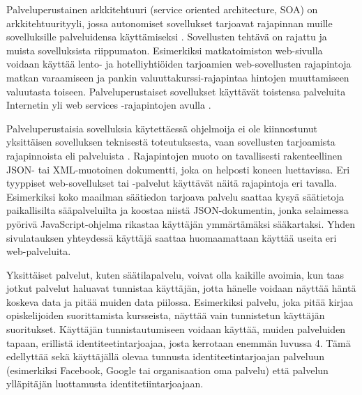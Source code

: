 Palveluperustainen arkkitehtuuri (service oriented architecture, SOA) on arkkitehtuurityyli, jossa autonomiset sovellukset tarjoavat rajapinnan muille sovelluksille palveluidensa käyttämiseksi \cite{soa}. Sovellusten tehtävä on rajattu ja muista sovelluksista riippumaton. Esimerkiksi matkatoimiston web-sivulla voidaan käyttää lento- ja hotelliyhtiöiden tarjoamien web-sovellusten rajapintoja matkan varaamiseen ja pankin valuuttakurssi-rajapintaa hintojen muuttamiseen valuutasta toiseen. Palveluperustaiset sovellukset käyttävät toistensa palveluita Internetin yli web services -rajapintojen avulla \cite{soa}.

Palveluperustaisia sovelluksia käytettäessä ohjelmoija ei ole kiinnostunut yksittäisen sovelluksen teknisestä toteutuksesta, vaan sovellusten tarjoamista rajapinnoista eli palveluista \cite{soa}. Rajapintojen muoto on tavallisesti rakenteellinen JSON- tai XML-muotoinen dokumentti, joka on helposti koneen luettavissa. Eri tyyppiset web-sovellukset tai -palvelut käyttävät näitä rajapintoja eri tavalla. Esimerkiksi koko maailman säätiedon tarjoava palvelu saattaa kysyä säätietoja paikallisilta sääpalveluilta ja koostaa niistä JSON-dokumentin, jonka selaimessa pyörivä JavaScript-ohjelma rikastaa käyttäjän ymmärtämäksi sääkartaksi. Yhden sivulatauksen yhteydessä käyttäjä saattaa huomaamattaan käyttää useita eri web-palveluita.

Yksittäiset palvelut, kuten säätilapalvelu, voivat olla kaikille avoimia, kun taas jotkut palvelut haluavat tunnistaa käyttäjän, jotta hänelle voidaan näyttää häntä koskeva data ja pitää muiden data piilossa. Esimerkiksi palvelu, joka pitää kirjaa opiskelijoiden suorittamista kursseista, näyttää vain tunnistetun käyttäjän suoritukset. Käyttäjän tunnistautumiseen voidaan käyttää, muiden palveluiden tapaan, erillistä identiteetintarjoajaa, josta kerrotaan enemmän luvussa 4. Tämä edellyttää sekä käyttäjällä olevaa tunnusta identiteetintarjoajan palveluun (esimerkiksi Facebook, Google tai organisaation oma palvelu) että palvelun ylläpitäjän luottamusta identitetiintarjoajaan.